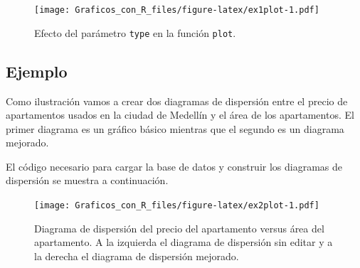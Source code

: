 \documentclass[10pt,]{krantz}
\makeatletter
\newenvironment{Shaded}{\begin{snugshade}}{\end{snugshade}}
\newcommand{\KeywordTok}[1]{\textcolor[rgb]{0.13,0.29,0.53}{\textbf{#1}}}
\newcommand{\DataTypeTok}[1]{\textcolor[rgb]{0.13,0.29,0.53}{#1}}
\newcommand{\DecValTok}[1]{\textcolor[rgb]{0.00,0.00,0.81}{#1}}
\newcommand{\StringTok}[1]{\textcolor[rgb]{0.31,0.60,0.02}{#1}}
\newcommand{\OperatorTok}[1]{\textcolor[rgb]{0.81,0.36,0.00}{\textbf{#1}}}
\newcommand{\NormalTok}[1]{#1}
\newenvironment{kframe}{%
\medskip{}
\setlength{\fboxsep}{.8em}
 \def\at@end@of@kframe{}%
 \ifinner\ifhmode%
  \def\at@end@of@kframe{\end{minipage}}%
  \begin{minipage}{\columnwidth}%
 \fi\fi%
 \def\FrameCommand##1{\hskip\@totalleftmargin \hskip-\fboxsep
 \colorbox{shadecolor}{##1}\hskip-\fboxsep
     \hskip-\linewidth \hskip-\@totalleftmargin \hskip\columnwidth}%
 \MakeFramed {\advance\hsize-\width
   \@totalleftmargin\z@ \linewidth\hsize
   \@setminipage}}%
 {\par\unskip\endMakeFramed%
 \at@end@of@kframe}
\renewenvironment{Shaded}{\begin{kframe}}{\end{kframe}}
\makeatother
\begin{document}
\begin{figure}
\centering
\texttt{[image: Graficos\_con\_R\_files/figure-latex/ex1plot-1.pdf]}
\caption{\label{fig:ex1plot}Efecto del parámetro \texttt{type} en la función
\texttt{plot}.}
\end{figure}

\newpage

\subsection*{Ejemplo}\label{ejemplo-10}


Como ilustración vamos a crear dos diagramas de dispersión entre el
precio de apartamentos usados en la ciudad de Medellín y el área de los
apartamentos. El primer diagrama es un gráfico básico mientras que el
segundo es un diagrama mejorado.

El código necesario para cargar la base de datos y construir los
diagramas de dispersión se muestra a continuación.

\begin{Shaded}
\end{Shaded}

\begin{figure}
\centering
\texttt{[image: Graficos\_con\_R\_files/figure-latex/ex2plot-1.pdf]}
\caption{\label{fig:ex2plot}Diagrama de dispersión del precio del
apartamento versus área del apartamento. A la izquierda el diagrama de
dispersión sin editar y a la derecha el diagrama de dispersión
mejorado.}
\end{figure}
\end{document}
